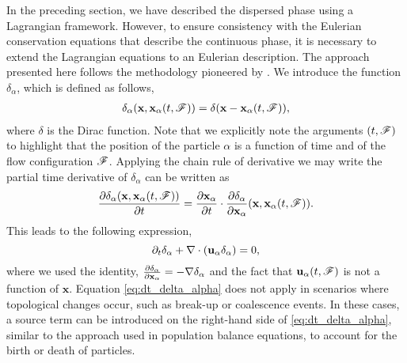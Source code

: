 In the preceding section, we have described the dispersed phase using a Lagrangian framework. 
However, to ensure consistency with the Eulerian conservation equations that describe the continuous phase, it is necessary to extend the Lagrangian equations to an Eulerian description. 
The approach presented here follows the methodology pioneered by \citep{lhuillier1992ensemble}.
We introduce the function $\delta_\alpha$, which is defined as follows, 
\begin{align}
    \delta_\alpha(\textbf{x},\textbf{x}_\alpha(t,\mathscr{F})) 
    = \delta(\textbf{x}-\textbf{x}_\alpha(t,\mathscr{F})),
    \label{eq:delta_alpha}
\end{align}
where $\delta$ is the Dirac function.
Note that we explicitly note the arguments $(t,\mathscr{F})$ to highlight that the position of the particle $\alpha$ is a function of time and of the flow configuration $\mathscr{F}$.
Applying the chain rule of derivative we may write the partial time derivative of $\delta_\alpha$ can be written as
\begin{equation}
\frac{\partial \delta_\alpha(\textbf{x},\textbf{x}_\alpha(t,\mathscr{F}))}{\partial t} 
=  \frac{\partial \textbf{x}_\alpha}{\partial t} 
\cdot \frac{\partial \delta_\alpha}{\partial \textbf{x}_\alpha}(\textbf{x},\textbf{x}_\alpha(t,\mathscr{F})) .
\end{equation}
This leads to the following expression, 
\begin{equation}
    \partial_t \delta_\alpha
    + \mathbf{\nabla}\cdot (\textbf{u}_\alpha  \delta_\alpha)
    =0,
    \label{eq:dt_delta_alpha}
\end{equation}
where we used the identity, $\frac{\partial \delta_\alpha}{\partial \textbf{x}_\alpha}  = -\mathbf{\nabla} \delta_\alpha$ and the fact that $\textbf{u}_\alpha(t,\mathscr{F})$ is not a function of $\textbf{x}$. 
Equation \ref{eq:dt_delta_alpha} does not apply in scenarios where topological changes occur, such as break-up or coalescence events. 
In these cases, a source term can be introduced on the right-hand side of \ref{eq:dt_delta_alpha}, similar to the approach used in population balance equations, to account for the birth or death of particles.
